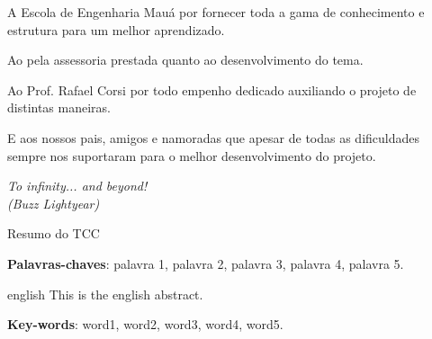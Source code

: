 \documentclass[
	12pt,				%
	openright,			%
	oneside,			%
	a4paper,			%
	english,			%
	french,				%
	spanish,			%
	brazil,				%
	oldfontcommands
	]{abntex2}
\begin{document}

\begin{agradecimentos}

A Escola de Engenharia Mauá por fornecer toda a gama de conhecimento e estrutura para um melhor aprendizado.

Ao {\imprimirorientador}  pela assessoria prestada quanto ao desenvolvimento do tema.

Ao Prof. Rafael Corsi por todo empenho dedicado auxiliando o projeto de distintas maneiras.

E aos nossos pais, amigos e namoradas que apesar de todas as dificuldades sempre nos suportaram para o melhor desenvolvimento do projeto.

\end{agradecimentos}

\begin{epigrafe}
    \vspace*{\fill}
	\begin{flushright}
		\textit{To infinity... and beyond!\\(Buzz Lightyear)}
	\end{flushright}
\end{epigrafe}


\setlength{\absparsep}{18pt} %
\begin{resumo}
 Resumo do TCC

 \textbf{Palavras-chaves}: palavra 1, palavra 2, palavra 3, palavra 4, palavra 5.
\end{resumo}

\begin{resumo}[Abstract]
 \begin{otherlanguage*}{english}
   This is the english abstract.

   \vspace{\onelineskip}
 
   \noindent 
   \textbf{Key-words}: word1, word2, word3, word4, word5.
 \end{otherlanguage*}
\end{resumo}

\listoffigures*
\cleardoublepage
\end{document}
